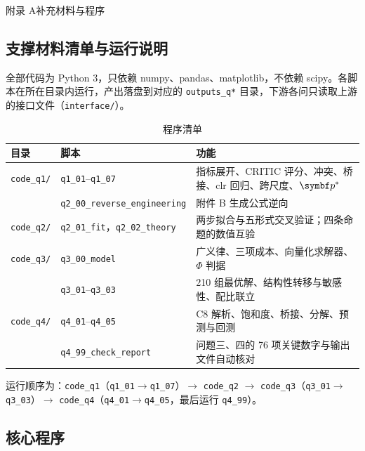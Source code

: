 \newpage
\begin{center}{\heiti\large 附录 A\quad 补充材料与程序}\end{center}
\setcounter{subsection}{0}
\renewcommand{\thesubsection}{A.\arabic{subsection}}

\subsection{支撑材料清单与运行说明}

全部代码为 Python 3，只依赖 numpy、pandas、matplotlib，不依赖 scipy。各脚本在所在目录内运行，产出落盘到对应的 \texttt{outputs\_q*} 目录，下游各问只读取上游的接口文件（\texttt{interface/}）。

\begin{table}[H]
\centering\small
\caption{程序清单}
\label{tab:code}
\begin{tabular}{p{2.3cm}p{5.2cm}p{7.2cm}}
\toprule
目录 & 脚本 & 功能 \\
\midrule
\texttt{code\_q1/} & \texttt{q1\_01}–\texttt{q1\_07} & 指标展开、CRITIC 评分、冲突、桥接、clr 回归、跨尺度、$\bp^*$ \\
 & \texttt{q2\_00\_reverse\_engineering} & 附件 B 生成公式逆向 \\
\texttt{code\_q2/} & \texttt{q2\_01\_fit}，\texttt{q2\_02\_theory} & 两步拟合与五形式交叉验证；四条命题的数值互验 \\
\texttt{code\_q3/} & \texttt{q3\_00\_model} & 广义律、三项成本、向量化求解器、$\Phi$ 判据 \\
 & \texttt{q3\_01}–\texttt{q3\_03} & 210 组最优解、结构性转移与敏感性、配比联立 \\
\texttt{code\_q4/} & \texttt{q4\_01}–\texttt{q4\_05} & C8 解析、饱和度、桥接、分解、预测与回测 \\
 & \texttt{q4\_99\_check\_report} & 问题三、四的 76 项关键数字与输出文件自动核对 \\
\bottomrule
\end{tabular}
\end{table}

运行顺序为：\texttt{code\_q1}（\texttt{q1\_01}$\to$\texttt{q1\_07}）$\to$ \texttt{code\_q2} $\to$ \texttt{code\_q3}（\texttt{q3\_01}$\to$\texttt{q3\_03}）$\to$ \texttt{code\_q4}（\texttt{q4\_01}$\to$\texttt{q4\_05}，最后运行 \texttt{q4\_99}）。

\subsection{核心程序}

